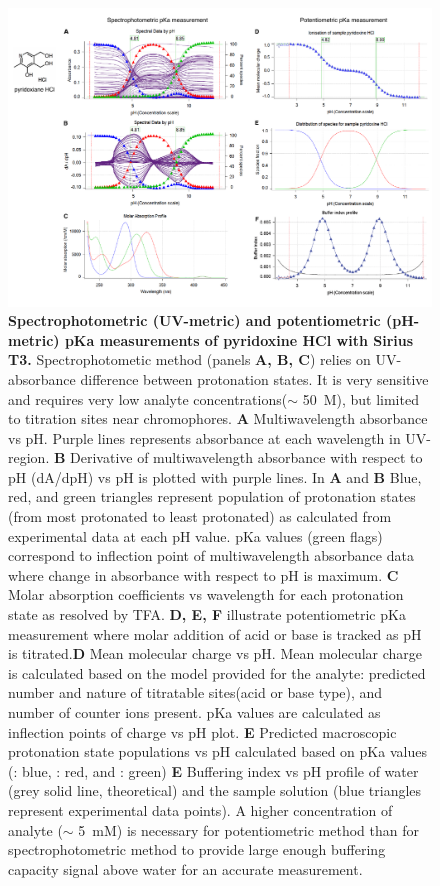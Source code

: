 \documentclass[9pt,lineno]{elife}
\begin{document}
\begin{figure}
\includegraphics[width=0.95\linewidth]{figures/UVmetric_vs_pHmetric_pKa_figure}
\caption{{\bf Spectrophotometric (UV-metric) and potentiometric (pH-metric) pKa measurements of pyridoxine HCl with Sirius T3.} Spectrophotometic method (panels \textbf{A, B, C}) relies on UV-absorbance difference between protonation states.  It is very sensitive and requires very low analyte concentrations($\sim$ 50~\micro M), but limited to titration sites near chromophores. \textbf{A} Multiwavelength absorbance vs pH. Purple lines represents absorbance at each wavelength in UV-region.  \textbf{B} Derivative of multiwavelength absorbance with respect to pH (dA/dpH) vs pH is plotted with purple lines. In \textbf{A} and \textbf{B} Blue, red, and green triangles represent population of protonation states (from most protonated to least protonated) as calculated from experimental data at each pH value. pKa values (green flags) correspond to inflection point of multiwavelength absorbance data where change in absorbance with respect to pH is maximum. \textbf{C} Molar absorption coefficients vs wavelength for each protonation state as resolved by TFA. \textbf{D, E, F} illustrate potentiometric pKa measurement where molar addition of acid or base is tracked as pH is titrated.\textbf{D} Mean molecular charge vs pH. Mean molecular charge is calculated based on the model provided for the analyte: predicted number and nature of titratable sites(acid or base type), and number of counter ions present. pKa values are calculated as inflection points of charge vs pH plot. \textbf{E} Predicted macroscopic protonation state populations vs pH calculated based on pKa values (: blue, : red, and : green) \textbf{E} Buffering index vs pH profile of water (grey solid line, theoretical) and the sample solution (blue triangles represent experimental data points). A higher concentration of analyte ($\sim$ 5~mM) is necessary for potentiometric method than for spectrophotometric method to provide large enough buffering capacity signal above water for an accurate measurement. 
}
\label{fig:UVmetric_vs_pHmetric_pKa}
\end{figure}
\end{document}
